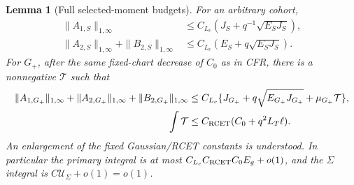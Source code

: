 \documentclass[11pt]{article}
\newtheorem{lemma}[theorem]{Lemma}
\theoremstyle{remark}\newtheorem{remark}[theorem]{Remark}
\newcommand{\Gp}{G_+}
\begin{document}
\begin{lemma}[Full selected-moment budgets]
\label{an03cfav1:selected}
For an arbitrary cohort,
\begin{align}
 \|A_{1,S}\|_{1,\infty}
   &\le C_{L_c}(J_S+q^{-1}\sqrt{E_SJ_S}),\nonumber\\
 \|A_{2,S}\|_{1,\infty}+\|B_{2,S}\|_{1,\infty}
   &\le C_{L_c}(E_S+q\sqrt{E_SJ_S}).
 \label{an03cfav1:genericselected}
\end{align}
For $\Gp$, after the same fixed-chart decrease of $C_0$ as
in CFR, there is a nonnegative $\mathcal T$ such that
\begin{align}
 \|A_{1,\Gp}\|_{1,\infty}
 +\|A_{2,\Gp}\|_{1,\infty}+\|B_{2,\Gp}\|_{1,\infty}
 &\le C_{L_c}\{J_{\Gp}+q\sqrt{E_{\Gp}J_{\Gp}}
                         +\mu_{\Gp}\mathcal T\},\nonumber\\
 \int\mathcal T&\le C_{\rm RCET}(C_0+q^2L_T\ell).
 \label{an03cfav1:primaryselected}
\end{align}
An enlargement of the fixed Gaussian/RCET constants is understood.
In particular the primary integral is at most
$C_{L_c}C_{\rm RCET}C_0E_g+o(1)$, and the $\Sigma$ integral
is $C\mathcal U_\Sigma+o(1)=o(1)$.
\end{lemma}
\end{document}
